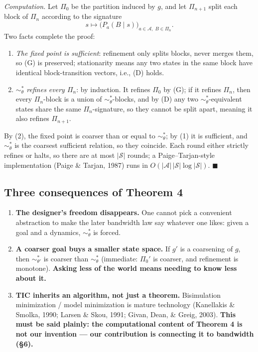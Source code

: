 \documentclass[11pt]{article}
\providecommand{\tightlist}{%
  \setlength{\itemsep}{0pt}\setlength{\parskip}{0pt}}
\begin{document}
\emph{Computation.} Let \(\Pi_0\) be the partition induced by \(g\), and let \(\Pi_{n+1}\) split each block of \(\Pi_n\) according to the signature
\[s\mapsto\big(P_a(B\mid s)\big)_{a\in\mathcal A,\;B\in\Pi_n}.\]
Two facts complete the proof:

\begin{enumerate}
\def\labelenumi{\arabic{enumi}.}
\tightlist
\item
  \emph{The fixed point is sufficient}: refinement only splits blocks, never merges them, so (G) is preserved; stationarity means any two states in the same block have identical block-transition vectors, i.e., (D) holds.
\item
  \emph{\(\sim_\theta^*\) refines every \(\Pi_n\)}: by induction. It refines \(\Pi_0\) by (G); if it refines \(\Pi_n\), then every \(\Pi_n\)-block is a union of \(\sim_\theta^*\)-blocks, and by (D) any two \(\sim_\theta^*\)-equivalent states share the same \(\Pi_n\)-signature, so they cannot be split apart, meaning it also refines \(\Pi_{n+1}\).
\end{enumerate}

By (2), the fixed point is coarser than or equal to \(\sim_\theta^*\); by (1) it is sufficient, and \(\sim_\theta^*\) is the coarsest sufficient relation, so they coincide. Each round either strictly refines or halts, so there are at most \(|\mathcal S|\) rounds; a Paige--Tarjan-style implementation (Paige \& Tarjan, 1987) runs in \(O(|\mathcal A|\,|\mathcal S|\log|\mathcal S|)\). \(\blacksquare\)

\hypertarget{three-consequences-of-theorem-4}{%
\subsection{Three consequences of Theorem 4}\label{three-consequences-of-theorem-4}}

\begin{enumerate}
\def\labelenumi{\arabic{enumi}.}
\tightlist
\item
  \textbf{The designer's freedom disappears.} One cannot pick a convenient abstraction to make the later bandwidth law say whatever one likes: given a goal and a dynamics, \(\sim_\theta^*\) is forced.
\item
  \textbf{A coarser goal buys a smaller state space.} If \(g'\) is a coarsening of \(g\), then \(\sim_{\theta'}^*\) is coarser than \(\sim_\theta^*\) (immediate: \(\Pi_0'\) is coarser, and refinement is monotone). \textbf{Asking less of the world means needing to know less about it.}
\item
  \textbf{TIC inherits an algorithm, not just a theorem.} Bisimulation minimization / model minimization is mature technology (Kanellakis \& Smolka, 1990; Larsen \& Skou, 1991; Givan, Dean, \& Greig, 2003). \textbf{This must be said plainly: the computational content of Theorem 4 is not our invention --- our contribution is connecting it to bandwidth (\S{}6).}
\end{enumerate}
\end{document}
